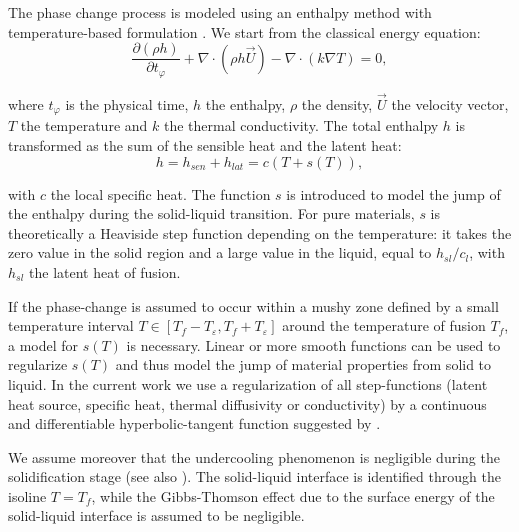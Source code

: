 The phase change process is modeled using an enthalpy method with temperature-based formulation  \citep{voller1987pcm,Cao1989,Cao1990}. We start from the classical energy equation:
\begin{equation}
\label{eq-energie}
   \frac{\partial (\rho h)}{\partial t_{\varphi}} + \nabla \cdot(\rho h \vec{U}) - \nabla \cdot (k \nabla T) = 0,
\end{equation}

\noindent where $t_{\varphi}$ is the physical time, $h$ the enthalpy, $\rho$ the density, $\vec{U}$  the velocity vector, $T$ the temperature and $k$ the thermal conductivity. 
The total enthalpy $h$ is transformed as the sum of the sensible heat and the latent heat:
\begin{equation}
\label{eq-enth-model}
  h = h_{sen} + h_{lat} = c ( T + s(T) ),
\end{equation} 

\noindent with $c$ the local specific heat. The function $s$ is introduced to model the jump of the enthalpy during the solid-liquid transition.  For pure materials, $s$ is theoretically  a Heaviside step function depending on the temperature: it takes the zero value in the solid region and a large value in the liquid, equal to $h_{sl}/c_l$, with $h_{sl}$ the latent heat of fusion. 

\noindent If the phase-change is assumed to occur within a mushy zone defined by a small temperature interval $  T \in [T_f - T_\varepsilon, T_f + T_\varepsilon] $ around the temperature of fusion $T_f$, a model for $s(T)$ is necessary. 
Linear  \citep{voller1987pcm,Wang2010} or more smooth functions \citep{dan-2014-JCP} can be used to regularize $s(T)$ and thus model the jump of material properties from solid to liquid.  
In the current work we use a regularization of all step-functions (latent heat source, specific heat, thermal diffusivity or conductivity) by a continuous and differentiable hyperbolic-tangent function suggested by \cite{dan-2014-JCP}.

\noindent We assume moreover that the undercooling phenomenon is negligible during the solidification stage (see also \cite{wang2010numerical,kowalewski2004phase}).
The solid-liquid interface is identified through the isoline $T=T_f$, while the Gibbs-Thomson effect due to the surface energy of the solid-liquid interface is assumed to be negligible.%

